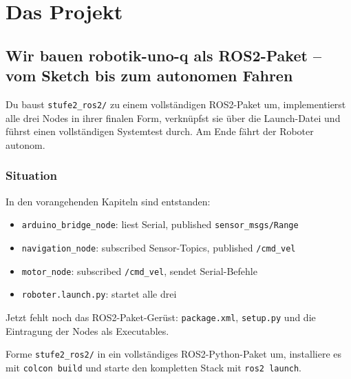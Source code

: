 
\part{Das Projekt}

\chapter{Wir bauen robotik-uno-q als ROS2-Paket –
  vom Sketch bis zum autonomen Fahren}

\begin{lernziele}
Du baust \texttt{stufe2\_ros2/} zu einem vollständigen ROS2-Paket um,
implementierst alle drei Nodes in ihrer finalen Form,
verknüpfst sie über die Launch-Datei
und führst einen vollständigen Systemtest durch.
Am Ende fährt der Roboter autonom.
\end{lernziele}

\section{Situation}

In den vorangehenden Kapiteln sind entstanden:
\begin{itemize}
\item \texttt{arduino\_bridge\_node}: liest Serial, published \texttt{sensor\_msgs/Range}
\item \texttt{navigation\_node}: subscribed Sensor-Topics, published \texttt{/cmd\_vel}
\item \texttt{motor\_node}: subscribed \texttt{/cmd\_vel}, sendet Serial-Befehle
\item \texttt{roboter.launch.py}: startet alle drei
\end{itemize}

Jetzt fehlt noch das ROS2-Paket-Gerüst:
\texttt{package.xml}, \texttt{setup.py} und die Eintragung
der Nodes als Executables.

\begin{aufgabeBox}
Forme \texttt{stufe2\_ros2/} in ein vollständiges ROS2-Python-Paket um,
installiere es mit \texttt{colcon build}
und starte den kompletten Stack mit \texttt{ros2 launch}.
\end{aufgabeBox}

